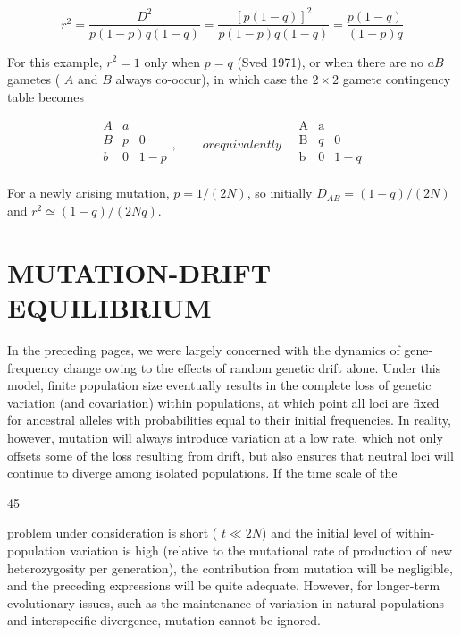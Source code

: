 \documentclass{article}
\begin{document}
\begin{equation}
r^{2}=\frac{D^{2}}{p(1-p)q(1-q)}=\frac{[p(1-q)]^{2}}{p(1-p)q(1-q)}=\frac{p(1-q)}{(1-p)q}
\end{equation}

For this example,  $ r^2 = 1 $ only when  $ p = q $ (Sved 1971), or when there are no  $ aB $ gametes ( $ A $ and  $ B $ always co-occur), in which case the  $ 2 \times 2 $ gamete contingency table becomes

\begin{equation}
\begin{array}{cccc}{{{A}}}&{{{a}}} \\{{{B}}}&{{{p}}}&{{{0}}} \\{{{b}}}&{{{0}}}&{{{1-p}}} \\\end{array},\qquad or equivalently \quad\begin{array}{cccc}{{{\mathrm{A}}}}&{{{\mathrm{a}}}} \\{{{\mathrm{B}}}}&{{{q}}}&{{{0}}} \\{{{\mathrm{b}}}}&{{{0}}}&{{{1-q}}} \\\end{array}
\end{equation}

For a newly arising mutation,  $ p = 1/(2N) $, so initially  $ D_{AB} = (1 - q)/(2N) $ and  $ r^2 \simeq (1 - q)/(2Nq) $.

\section{MUTATION-DRIFT EQUILIBRIUM}
In the preceding pages, we were largely concerned with the dynamics of gene-frequency change owing to the effects of random genetic drift alone. Under this model, finite population size eventually results in the complete loss of genetic variation (and covariation) within populations, at which point all loci are fixed for ancestral alleles with probabilities equal to their initial frequencies. In reality, however, mutation will always introduce variation at a low rate, which not only offsets some of the loss resulting from drift, but also ensures that neutral loci will continue to diverge among isolated populations. If the time scale of the

45

problem under consideration is short ( $ t \ll 2N $) and the initial level of within-population variation is high (relative to the mutational rate of production of new heterozygosity per generation), the contribution from mutation will be negligible, and the preceding expressions will be quite adequate. However, for longer-term evolutionary issues, such as the maintenance of variation in natural populations and interspecific divergence, mutation cannot be ignored.
\end{document}
